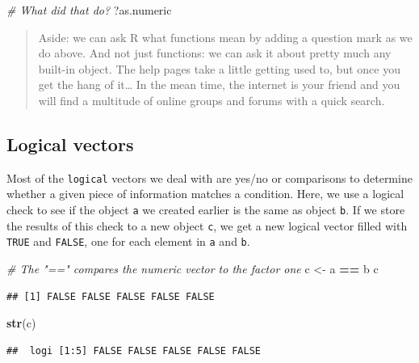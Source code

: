 \documentclass[
]{book}
\newenvironment{Shaded}{\begin{snugshade}}{\end{snugshade}}
\newcommand{\CommentTok}[1]{\textcolor[rgb]{0.56,0.35,0.01}{\textit{#1}}}
\newcommand{\KeywordTok}[1]{\textcolor[rgb]{0.13,0.29,0.53}{\textbf{#1}}}
\newcommand{\NormalTok}[1]{#1}
\newcommand{\OperatorTok}[1]{\textcolor[rgb]{0.81,0.36,0.00}{\textbf{#1}}}
\newcommand{\StringTok}[1]{\textcolor[rgb]{0.31,0.60,0.02}{#1}}
\begin{document}
\begin{Shaded}
\begin{Highlighting}[]
\CommentTok{# What did that do?}
\NormalTok{?as.numeric}
\end{Highlighting}
\end{Shaded}

\begin{quote}
Aside: we can ask R what functions mean by adding a question mark as we do above. And not just functions: we can ask it about pretty much any built-in object. The help pages take a little getting used to, but once you get the hang of it\ldots{} In the mean time, the internet is your friend and you will find a multitude of online groups and forums with a quick search.
\end{quote}

\hypertarget{logicals}{%
\subsection*{Logical vectors}\label{logicals}}

Most of the \texttt{logical} vectors we deal with are yes/no or comparisons to determine whether a given piece of information matches a condition. Here, we use a logical check to see if the object \texttt{a} we created earlier is the same as object \texttt{b}. If we store the results of this check to a new object \texttt{c}, we get a new logical vector filled with \texttt{TRUE} and \texttt{FALSE}, one for each element in \texttt{a} and \texttt{b}.

\begin{Shaded}
\begin{Highlighting}[]
\CommentTok{# The "==" compares the numeric vector to the factor one}
\NormalTok{c <-}\StringTok{ }\NormalTok{a }\OperatorTok{==}\StringTok{ }\NormalTok{b}
\NormalTok{c}
\end{Highlighting}
\end{Shaded}

\begin{verbatim}
## [1] FALSE FALSE FALSE FALSE FALSE
\end{verbatim}

\begin{Shaded}
\begin{Highlighting}[]
\KeywordTok{str}\NormalTok{(c)}
\end{Highlighting}
\end{Shaded}

\begin{verbatim}
##  logi [1:5] FALSE FALSE FALSE FALSE FALSE
\end{verbatim}
\end{document}
